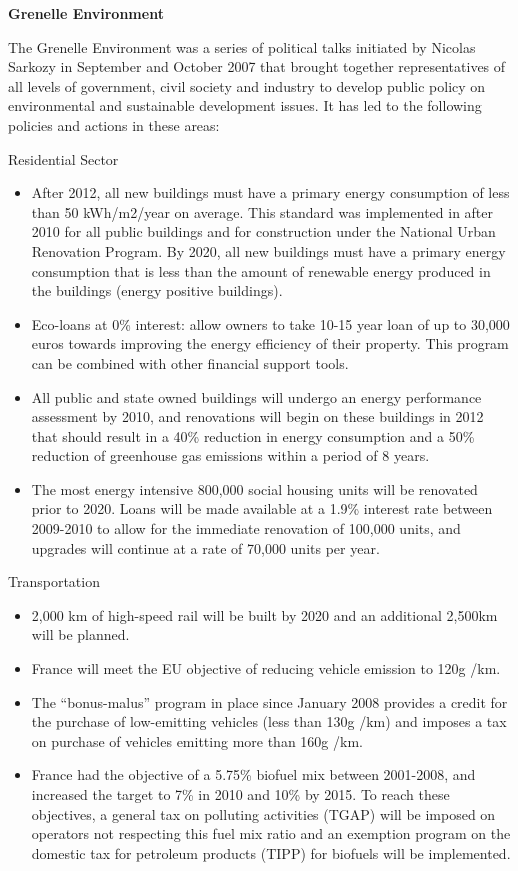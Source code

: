 \textbf{Grenelle Environment}



The Grenelle Environment was a series of political talks initiated by Nicolas Sarkozy in September and October 2007 that brought together representatives of all levels of government, civil society and industry to develop public policy on environmental and sustainable development issues. 
It has led to the following policies and actions in these areas:


Residential Sector
\begin{itemize}
	\item After 2012, all new buildings must have a primary energy consumption of less than 50 kWh/m2/year on average. This standard was implemented in after 2010 for all public buildings and for construction under the National Urban Renovation Program. By 2020, all new buildings must have a primary energy consumption that is less than the amount of renewable energy produced in the buildings (energy positive buildings).
	\item Eco-loans at 0\% interest: allow owners to take 10-15 year loan of up to 30,000 euros towards improving the energy efficiency of their property. This program can be combined with other financial support tools.
	\item All public and state owned buildings will undergo an energy performance assessment by 2010,  and renovations will begin on these buildings in 2012 that should result in a 40\% reduction in energy consumption and a 50\% reduction of greenhouse gas emissions within a period of 8 years.
	\item The most energy intensive 800,000 social housing units will be renovated prior to 2020. Loans will be made available at a 1.9\% interest rate between 2009-2010 to allow for the immediate renovation of 100,000 units, and upgrades will continue at a rate of 70,000 units per year.
\end{itemize}



Transportation
\begin{itemize}
	\item 2,000 km of high-speed rail will be built by 2020 and an additional 2,500km will be planned. 
	\item France will meet the EU objective of reducing vehicle emission to 120g /km.
	\item The “bonus-malus” program in place since January 2008 provides a credit for the purchase of low-emitting vehicles  (less than 130g /km) and imposes a tax on purchase of vehicles emitting more than 160g /km.
	\item France had the objective of a 5.75\% biofuel mix between 2001-2008, and increased the target to 7\% in 2010 and 10\% by 2015. To reach these objectives, a general tax on polluting activities (TGAP) will be imposed on operators not respecting this fuel mix ratio and an exemption program on the domestic tax for petroleum products (TIPP) for biofuels will be implemented.
\end{itemize}



